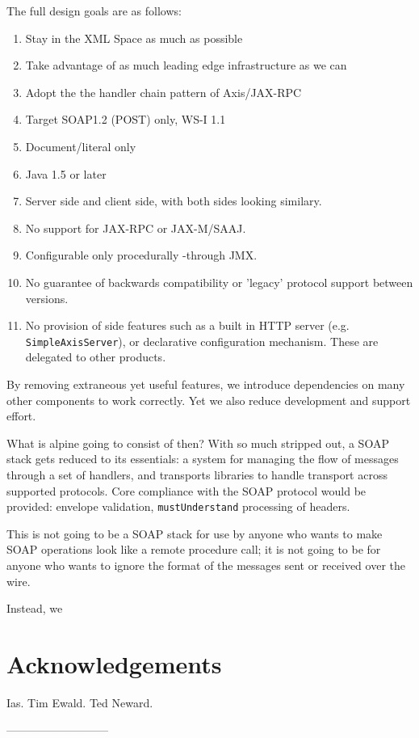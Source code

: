 \documentclass[draft]{article}
\begin{document}
The full design goals are as follows:

\begin{enumerate}

\item Stay in the XML Space as much as possible
\item Take advantage of as much leading edge infrastructure as we can
\item Adopt the the handler chain pattern of Axis/JAX-RPC
\item Target SOAP1.2 (POST) only, WS-I 1.1
\item Document/literal only
\item Java 1.5 or later 
\item Server side and client side, with both sides looking similary. 
\item No support for JAX-RPC or JAX-M/SAAJ.
\item Configurable only procedurally -through JMX. 
\item No guarantee of backwards compatibility or 'legacy' protocol support between versions. 

\item No provision of side features such as a built in HTTP server (e.g.
\verb|SimpleAxisServer|), or declarative configuration mechanism.
These are delegated to other products.
\end{enumerate}

By removing extraneous yet useful features, we introduce dependencies on
many other components to work correctly. Yet we also reduce development
and support effort. 

What is alpine going to consist of then? With so much stripped out, a
SOAP stack gets reduced to its essentials: a system for managing the
flow of messages through a set of handlers, and transports libraries to
handle transport across supported protocols. Core compliance with the
SOAP protocol would be provided: envelope validation,
\verb|mustUnderstand| processing of headers. 

This is not going to be a SOAP stack for use by anyone who wants to make
SOAP operations look like a remote procedure call; it is not going to be
for anyone who wants to ignore the format of the messages sent or
received over the wire. 

Instead, we 

\section{Acknowledgements}

Ias. Tim Ewald. Ted Neward.  


---------------------------







\onecolumn

%


\end{document}
